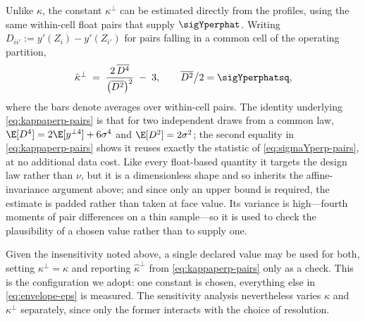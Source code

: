 \begin{remark}
Unlike $\kappa$, the constant $\kappa^{\perp}$ can be estimated directly
from the profiles, using the same within-cell float pairs that supply
$\sigYperphat$. Writing $D_{ii'}:=y'(Z_i)-y'(Z_{i'})$ for pairs falling
in a common cell of the operating partition,
\begin{equation}
  \hat\kappa^{\perp}
  \;=\;\frac{2\,\overline{D^4}}{\big(\overline{D^2}\big)^{2}}\;-\;3,
  \qquad
  \overline{D^{2}}\big/2=\sigYperphatsq ,
  \label{eq:kappaperp-pairs}
\end{equation}
where the bars denote averages over within-cell pairs. The identity
underlying \eqref{eq:kappaperp-pairs} is that for two independent draws
from a common law, $\E[D^4]=2\E[y^{\perp4}]+6\sigma^4$ and
$\E[D^2]=2\sigma^2$; the second equality in \eqref{eq:kappaperp-pairs}
shows it reuses exactly the statistic of \eqref{eq:sigmaYperp-pairs}, at
no additional data cost. Like every float-based quantity it targets the
design law rather than $\nu$, but it is a dimensionless shape and so
inherits the affine-invariance argument above; and since only an upper
bound is required, the estimate is padded rather than taken at face
value. Its variance is high---fourth moments of pair differences on a
thin sample---so it is used to check the plausibility of a chosen value
rather than to supply one.

Given the insensitivity noted above, a single declared value may be used
for both, setting $\kappa^{\perp}=\kappa$ and reporting
$\hat\kappa^{\perp}$ from \eqref{eq:kappaperp-pairs} only as a check.
This is the configuration we adopt: one constant is chosen, everything
else in \eqref{eq:envelope-eps} is measured. The sensitivity analysis
nevertheless varies $\kappa$ and $\kappa^{\perp}$ separately, since only
the former interacts with the choice of resolution.
\end{remark}

